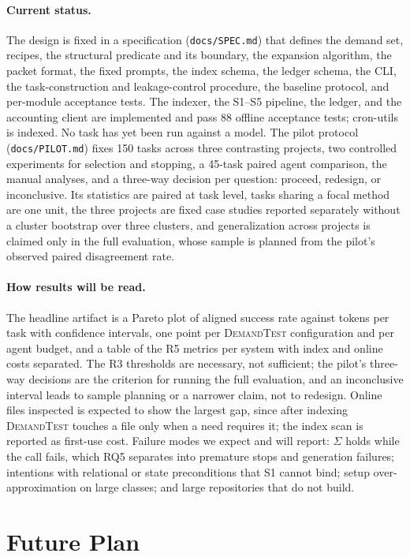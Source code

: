\documentclass[sigconf,nonacm]{acmart}
\newcommand{\tool}{\textsc{DemandTest}\xspace}
\newcommand{\suff}{\ensuremath{\Sigma}\xspace}
\begin{document}
\paragraph{Current status.}
The design is fixed in a specification (\texttt{docs/SPEC.md}) that defines the demand set, recipes, the structural predicate and its boundary, the expansion algorithm, the packet format, the fixed prompts, the index schema, the ledger schema, the CLI, the task-construction and leakage-control procedure, the baseline protocol, and per-module acceptance tests. The indexer, the S1--S5 pipeline, the ledger, and the accounting client are implemented and pass 88 offline acceptance tests; cron-utils is indexed. No task has yet been run against a model. The pilot protocol (\texttt{docs/PILOT.md}) fixes 150 tasks across three contrasting projects, two controlled experiments for selection and stopping, a 45-task paired agent comparison, the manual analyses, and a three-way decision per question: proceed, redesign, or inconclusive. Its statistics are paired at task level, tasks sharing a focal method are one unit, the three projects are fixed case studies reported separately without a cluster bootstrap over three clusters, and generalization across projects is claimed only in the full evaluation, whose sample is planned from the pilot's observed paired disagreement rate.

\paragraph{How results will be read.}
The headline artifact is a Pareto plot of aligned success rate against tokens per task with confidence intervals, one point per \tool configuration and per agent budget, and a table of the R5 metrics per system with index and online costs separated. The R3 thresholds are necessary, not sufficient; the pilot's three-way decisions are the criterion for running the full evaluation, and an inconclusive interval leads to sample planning or a narrower claim, not to redesign. Online files inspected is expected to show the largest gap, since after indexing \tool touches a file only when a need requires it; the index scan is reported as first-use cost. Failure modes we expect and will report: \suff holds while the call fails, which RQ5 separates into premature stops and generation failures; intentions with relational or state preconditions that S1 cannot bind; setup over-approximation on large classes; and large repositories that do not build.

\section{Future Plan}
\label{sec:plan}
\end{document}
